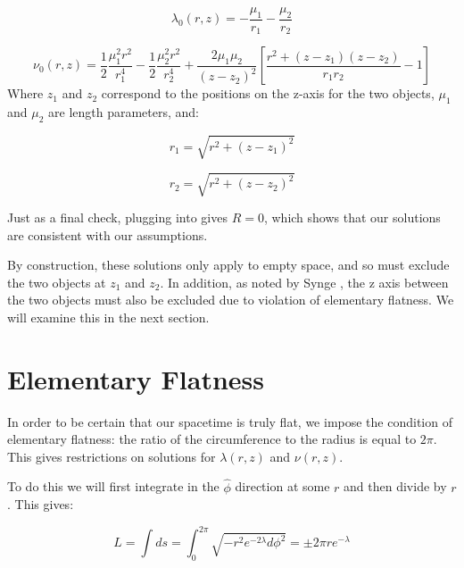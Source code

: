 \documentclass{article}
\begin{document}
\begin{equation}
\lambda_0(r,z)=-\frac{\mu_1}{r_1}-\frac{\mu_2}{r_2}
\label{eq:lambda-0}
\end{equation}

\begin{equation}
	\label{eq:nu-0}
	\nu_0(r,z)=\frac{1}{2}\frac{\mu_{1}^{2}r^2}{r_{1}^{4}}-\frac{1}{2}\frac{\mu_{2}^{2}r^2}{r_{2}^{4}}+\frac{2\mu_1\mu_2}{(z-z_2)^2}\left[\frac{r^2+(z-z_1)(z-z_2)}{r_{1}r_{2}}-1\right]
\end{equation}
Where $z_1$ and $z_2$ correspond to the positions on the z-axis for the two objects, $\mu_1$ and $\mu_2$ are length parameters, and:

\begin{equation}
r_1=\sqrt{r^2+(z-z_1)^2}
\label{eq:r_1}
\end{equation}

\begin{equation}
r_2=\sqrt{r^2+(z-z_2)^2}
\label{eq:r_2}
\end{equation}

Just as a final check, plugging  into  gives $R=0$, which shows that our solutions are consistent with our assumptions.

By construction, these solutions only apply to empty space, and so must exclude the two objects at $z_1$ and $z_2$. In addition, as noted by Synge \cite{synge_relativity}, the z axis between the two objects must also be excluded due to violation of elementary flatness. We will examine this in the next section.

\section{Elementary Flatness}

In order to be certain that our spacetime is truly flat, we impose the condition of elementary flatness: the ratio of the circumference to the radius is equal to $2\pi$. This gives restrictions on solutions for $\lambda\left(r,z\right)$ and $\nu\left(r,z\right)$.

To do this we will first integrate in the $\hat{\phi}$ direction at
some $r$ and then divide by $r$. This gives:

\begin{equation}
  \label{eq:phi-hat-length}
  L=\int ds =
  \int_0^{2\pi}\sqrt{-r^2e^{-2\lambda}d\phi^2}=\pm2\pi r e^{-\lambda}
\end{equation}
\end{document}
